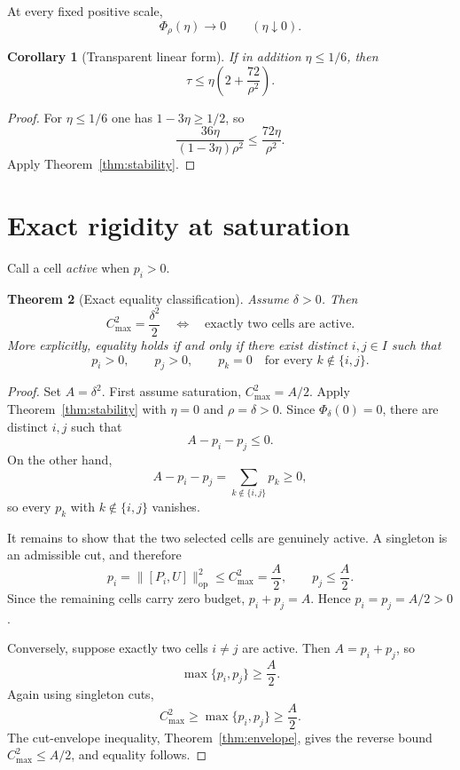 \documentclass[11pt]{article}
\newtheorem{theorem}{Theorem}[section]
\newtheorem{corollary}[theorem]{Corollary}
\newcommand{\op}{\mathrm{op}}
\newcommand{\cmax}{C_{\max}}
\newcommand{\dd}{\delta}
\newcommand{\etaq}{\eta}
\newcommand{\tauq}{\tau}
\newcommand{\PhiRho}{\Phi_{\rho}}
\begin{document}
At every fixed positive scale,
\[
  \PhiRho(\etaq)\longrightarrow0
  \qquad(\etaq\downarrow0).
\]

\begin{corollary}[Transparent linear form]\label{cor:linear}
If in addition $\etaq\le1/6$, then
\begin{equation}\label{eq:linear}
  \boxed{
    \tauq\le
    \etaq\left(2+\frac{72}{\rho^2}\right).
  }
\end{equation}
\end{corollary}

\begin{proof}
For $\etaq\le1/6$ one has
$1-3\etaq\ge1/2$, so
\[
  \frac{36\etaq}{(1-3\etaq)\rho^2}
  \le
  \frac{72\etaq}{\rho^2}.
\]
Apply Theorem~\ref{thm:stability}.
\end{proof}


\section{Exact rigidity at saturation}

Call a cell \emph{active} when $p_i>0$.

\begin{theorem}[Exact equality classification]\label{thm:rigidity}
Assume $\dd>0$.  Then
\[
  \boxed{
    \cmax^2=\frac{\dd^2}{2}
    \quad\Longleftrightarrow\quad
    \text{exactly two cells are active}.
  }
\]
More explicitly, equality holds if and only if there exist distinct
$i,j\in I$ such that
\[
  p_i>0,\qquad p_j>0,\qquad
  p_k=0\quad\text{for every }k\notin\{i,j\}.
\]
\end{theorem}

\begin{proof}
Set $A=\dd^2$.  First assume saturation,
$\cmax^2=A/2$.  Apply Theorem~\ref{thm:stability} with
$\etaq=0$ and $\rho=\dd>0$.  Since $\Phi_{\dd}(0)=0$, there are distinct
$i,j$ such that
\[
  A-p_i-p_j\le0.
\]
On the other hand,
\[
  A-p_i-p_j=\sum_{k\notin\{i,j\}}p_k\ge0,
\]
so every $p_k$ with $k\notin\{i,j\}$ vanishes.

It remains to show that the two selected cells are genuinely active.  A
singleton is an admissible cut, and therefore
\[
  p_i=\|[P_i,U]\|_{\op}^2\le\cmax^2=\frac A2,
  \qquad
  p_j\le\frac A2.
\]
Since the remaining cells carry zero budget, $p_i+p_j=A$.  Hence
$p_i=p_j=A/2>0$.

Conversely, suppose exactly two cells $i\ne j$ are active.  Then
$A=p_i+p_j$, so
\[
  \max\{p_i,p_j\}\ge\frac A2.
\]
Again using singleton cuts,
\[
  \cmax^2\ge\max\{p_i,p_j\}\ge\frac A2.
\]
The cut-envelope inequality, Theorem~\ref{thm:envelope}, gives the reverse
bound $\cmax^2\le A/2$, and equality follows.
\end{proof}
\end{document}
